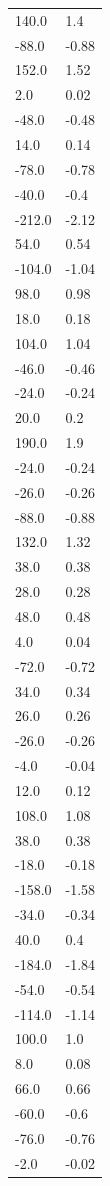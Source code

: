 \begin{longtable}{ll}
140.0 & 1.4 \\
-88.0 & -0.88 \\
152.0 & 1.52 \\
2.0 & 0.02 \\
-48.0 & -0.48 \\
14.0 & 0.14 \\
-78.0 & -0.78 \\
-40.0 & -0.4 \\
-212.0 & -2.12 \\
54.0 & 0.54 \\
-104.0 & -1.04 \\
98.0 & 0.98 \\
18.0 & 0.18 \\
104.0 & 1.04 \\
-46.0 & -0.46 \\
-24.0 & -0.24 \\
20.0 & 0.2 \\
190.0 & 1.9 \\
-24.0 & -0.24 \\
-26.0 & -0.26 \\
-88.0 & -0.88 \\
132.0 & 1.32 \\
38.0 & 0.38 \\
28.0 & 0.28 \\
48.0 & 0.48 \\
4.0 & 0.04 \\
-72.0 & -0.72 \\
34.0 & 0.34 \\
26.0 & 0.26 \\
-26.0 & -0.26 \\
-4.0 & -0.04 \\
12.0 & 0.12 \\
108.0 & 1.08 \\
38.0 & 0.38 \\
-18.0 & -0.18 \\
-158.0 & -1.58 \\
-34.0 & -0.34 \\
40.0 & 0.4 \\
-184.0 & -1.84 \\
-54.0 & -0.54 \\
-114.0 & -1.14 \\
100.0 & 1.0 \\
8.0 & 0.08 \\
66.0 & 0.66 \\
-60.0 & -0.6 \\
-76.0 & -0.76 \\
-2.0 & -0.02 \\

\end{longtable}
